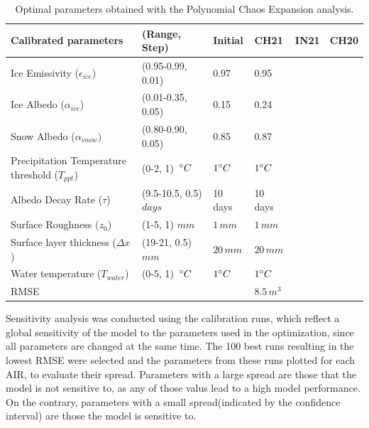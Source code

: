 \documentclass[utf8]{frontiersSCNS} %
\begin{document}
\begin{table}[]
\centering
\caption{Optimal parameters obtained with the Polynomial Chaos Expansion analysis.}
\label{tab:parameters}
\begin{tabular}{@{}llllll@{}}
\toprule
\textbf{Calibrated parameters} & \textbf{(Range, Step)} & \textbf{Initial} & \textbf{CH21} & \textbf{IN21} & \textbf{CH20} \\\midrule
Ice Emissivity ($\epsilon_{ice}$)               & (0.95-0.99, 0.01)                    & 0.97        & 0.95  &  &  \\
Ice Albedo ($\alpha_{ice}$)                     & (0.01-0.35, 0.05)                    & 0.15        & 0.24  &  &  \\
Snow Albedo ($\alpha_{snow})$                   & (0.80-0.90, 0.05)                    & 0.85        & 0.87  &  &  \\
Precipitation Temperature threshold ($T_{ppt}$) & (0-2, 1) $\,\degree C$ & $1\degree C$& $1\degree C$ &  &  \\
Albedo Decay Rate ($\tau$)                      & (9.5-10.5, 0.5) $days$                     & 10 days     & 10 days &  &  \\
Surface Roughness ($z_0$)                       & (1-5, 1) $mm$                     & $1\,mm$     & $1\,mm$ &  &  \\ 
Surface layer thickness ($\Delta x$)            & (19-21, 0.5) $mm$                    & $20\,mm$    & $20\,mm$ &  &  \\
Water temperature ($T_{water}$)                 & (0-5, 1) $\,\degree C$              & $1\degree C$&$1\degree C$  &  &  \\\midrule  
RMSE                                            &             &         &$8.5\, m^3$  &  &  \\ \bottomrule
\end{tabular}
\end{table}

Sensitivity analysis was conducted using the calibration runs, which reflect a global sensitivity of the model to the
parameters used in the optimization, since all parameters are changed at the same time.  The 100 best runs resulting in
the lowest RMSE were selected and the parameters from these runs plotted for each AIR, to evaluate their spread.
Parameters with a large spread are those that the model is not sensitive to, as any of those valus lead to a high model
performance. On the contrary, parameters with a small spread(indicated by the confidence interval) are those the model
is sensitive to. 
\end{document}
